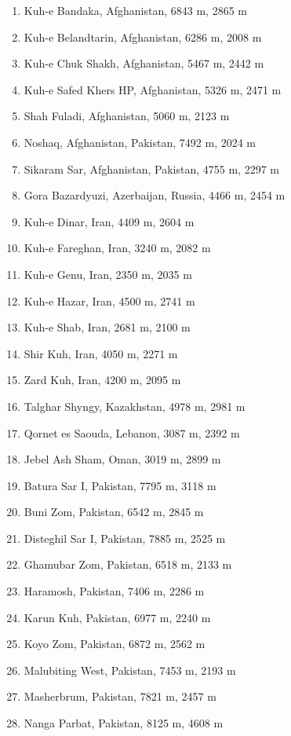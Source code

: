 \documentclass[10pt,twocolumn,letterpaper]{article}
\begin{document}
\begin{flushleft}
\begin{enumerate}
    \item Kuh-e Bandaka, Afghanistan, 6843 m, 2865 m
    \item Kuh-e Belandtarin, Afghanistan, 6286 m, 2008 m
    \item Kuh-e Chuk Shakh, Afghanistan, 5467 m, 2442 m
    \item Kuh-e Safed Khers HP, Afghanistan, 5326 m, 2471 m
    \item Shah Fuladi, Afghanistan, 5060 m, 2123 m
    \item Noshaq, Afghanistan, Pakistan, 7492 m, 2024 m
    \item Sikaram Sar, Afghanistan, Pakistan, 4755 m, 2297 m
    \item Gora Bazardyuzi, Azerbaijan, Russia, 4466 m, 2454 m
    \item Kuh-e Dinar, Iran, 4409 m, 2604 m
    \item Kuh-e Fareghan, Iran, 3240 m, 2082 m
    \item Kuh-e Genu, Iran, 2350 m, 2035 m
    \item Kuh-e Hazar, Iran, 4500 m, 2741 m
    \item Kuh-e Shab, Iran, 2681 m, 2100 m
    \item Shir Kuh, Iran, 4050 m, 2271 m
    \item Zard Kuh, Iran, 4200 m, 2095 m
    \item Talghar Shyngy, Kazakhstan, 4978 m, 2981 m
    \item Qornet es Saouda, Lebanon, 3087 m, 2392 m
    \item Jebel Ash Sham, Oman, 3019 m, 2899 m
    \item Batura Sar I, Pakistan, 7795 m, 3118 m
    \item Buni Zom, Pakistan, 6542 m, 2845 m
    \item Disteghil Sar I, Pakistan, 7885 m, 2525 m
    \item Ghamubar Zom, Pakistan, 6518 m, 2133 m
    \item Haramosh, Pakistan, 7406 m, 2286 m
    \item Karun Kuh, Pakistan, 6977 m, 2240 m
    \item Koyo Zom, Pakistan, 6872 m, 2562 m
    \item Malubiting West, Pakistan, 7453 m, 2193 m
    \item Masherbrum, Pakistan, 7821 m, 2457 m
    \item Nanga Parbat, Pakistan, 8125 m, 4608 m

\end{enumerate}
\end{flushleft}
\end{document}

